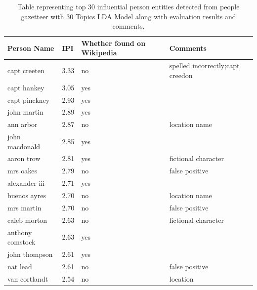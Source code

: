 \documentclass[10pt,journal,compsoc]{IEEEtran}
\begin{document}
\begin{table}
\caption{Table representing top 30 influential person entities detected from people gazetteer with 30 Topics LDA Model along with evaluation results and comments.}
\label{table:app1}
\centering
\begin{tabular}{|l|l|p{3cm}|p{3cm}|}
\hline
\textbf{Person Name}      & \textbf{IPI}      & \textbf{Whether found on Wikipedia} & \textbf{Comments}                                     \\ \hline
capt creeten	 & 3.33 & no                 & spelled incorrectly;capt creedon \\ \hline
capt hankey      & 3.05 & yes                &                                      \\ \hline
capt pinckney    & 2.93 & yes                &                                      \\ \hline
john martin   & 2.89 & yes                &                                      \\ \hline
ann arbor	& 2.87	& no & location name		\\ \hline
john macdonald      & 2.85 & yes                &                                      \\ \hline
aaron trow       & 2.81 & yes                & fictional character                  \\ \hline
mrs oakes        & 2.79 & no                 & false positive                       \\ \hline
alexander iii    & 2.71 & yes                &                                      \\ \hline
buenos ayres     & 2.70 & no                 & location name                            \\ \hline
mrs martin       & 2.70 & no                 & false positive                       \\ \hline
caleb morton     & 2.63  & no                 & fictional character                  \\ \hline
anthony comstock & 2.63 & yes                &                                      \\ \hline
john thompson    & 2.61 & yes                &                                      \\ \hline
nat lead         & 2.61 & no                 & false positive                       \\ \hline
van cortlandt    & 2.54 & no                 & location                             \\ \hline

\end{tabular}
\end{table}
\end{document}
